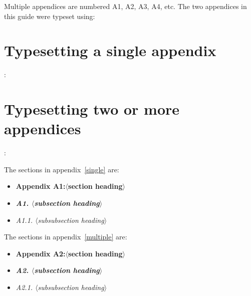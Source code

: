 \documentclass{cje}          %
\theoremstyle{plain}%
\theoremstyle{definition}
\theoremstyle{remark}
\begin{document}
Multiple appendices are numbered A1, A2, A3, A4, etc.
The two appendices in this guide were typeset using:
\begin{smallverbatim}
\appendix
\section{Typesetting a single appendix}
 :
\section{Typesetting two or more appendices}
 :
\end{smallverbatim}

The sections in appendix~\ref{single} are:
  \begin{itemize}
    \item \textbf{Appendix A1:\enskip $\langle$section heading$\rangle$}
    \item {\bfseries\textit{A1. $\langle$subsection heading$\rangle$}} 
    \item \textit{A1.1. $\langle$subsubsection heading$\rangle$}
  \end{itemize} 
The sections in appendix~\ref{multiple} are:
  \begin{itemize}
    \item \textbf{Appendix A2:\enskip $\langle$section heading$\rangle$}
    \item {\bfseries\textit{A2. $\langle$subsection heading$\rangle$}} 
    \item \textit{A2.1. $\langle$subsubsection heading$\rangle$}
  \end{itemize} 

\end{document}
